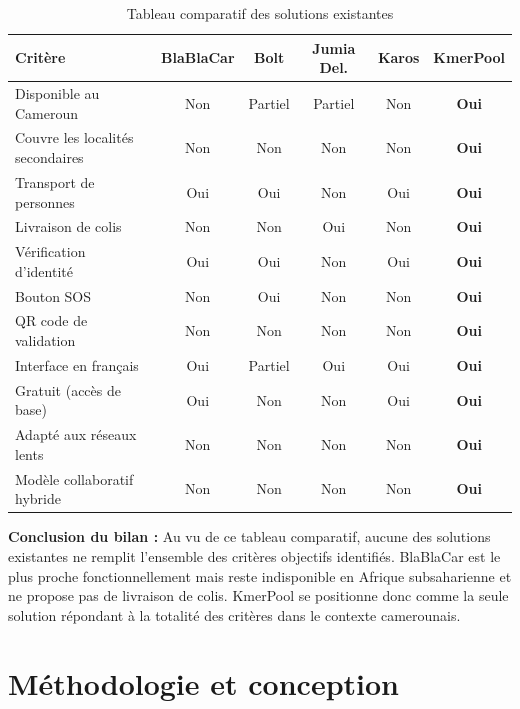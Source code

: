 \documentclass[12pt, a4paper]{report}
\begin{document}
\begin{table}[H]
\centering
\caption{Tableau comparatif des solutions existantes}
\label{tab:bilan}
\renewcommand{\arraystretch}{1.3}
\begin{tabularx}{\textwidth}{|X|c|c|c|c|c|}
\hline
\textbf{Critère} & \textbf{BlaBlaCar} & \textbf{Bolt} & \textbf{Jumia Del.} & \textbf{Karos} & \textbf{KmerPool} \\
\hline
Disponible au Cameroun & Non & Partiel & Partiel & Non & \textbf{Oui} \\
\hline
Couvre les localités secondaires & Non & Non & Non & Non & \textbf{Oui} \\
\hline
Transport de personnes & Oui & Oui & Non & Oui & \textbf{Oui} \\
\hline
Livraison de colis & Non & Non & Oui & Non & \textbf{Oui} \\
\hline
Vérification d'identité & Oui & Oui & Non & Oui & \textbf{Oui} \\
\hline
Bouton SOS & Non & Oui & Non & Non & \textbf{Oui} \\
\hline
QR code de validation & Non & Non & Non & Non & \textbf{Oui} \\
\hline
Interface en français & Oui & Partiel & Oui & Oui & \textbf{Oui} \\
\hline
Gratuit (accès de base) & Oui & Non & Non & Oui & \textbf{Oui} \\
\hline
Adapté aux réseaux lents & Non & Non & Non & Non & \textbf{Oui} \\
\hline
Modèle collaboratif hybride & Non & Non & Non & Non & \textbf{Oui} \\
\hline
\end{tabularx}
\end{table}

\bigskip
\noindent\textbf{Conclusion du bilan :} Au vu de ce tableau comparatif, aucune des solutions
existantes ne remplit l'ensemble des critères objectifs identifiés. BlaBlaCar est le plus
proche fonctionnellement mais reste indisponible en Afrique subsaharienne et ne propose
pas de livraison de colis. KmerPool se positionne donc comme la seule solution répondant
à la totalité des critères dans le contexte camerounais.

\chapter{Méthodologie et conception}
\end{document}
